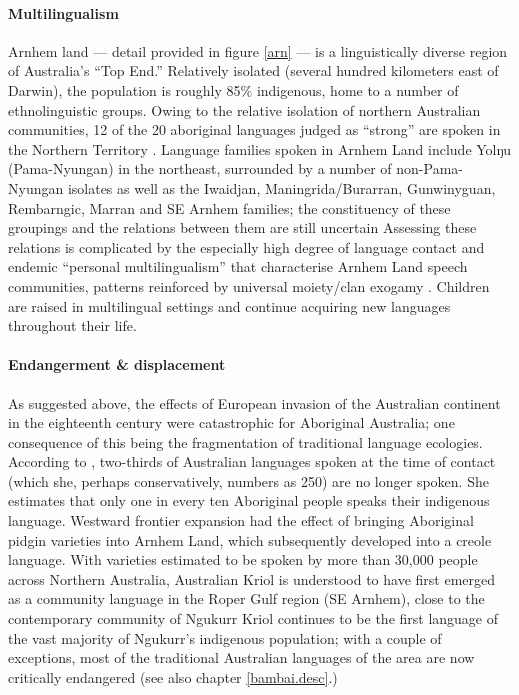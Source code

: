 \documentclass[12pt,dvipsnames]{report}
\begin{document}
\paragraph*{Multilingualism}

Arnhem land --- detail provided in figure \ref{arn} --- is a linguistically diverse region of Australia's ``Top End.'' Relatively isolated (several hundred kilometers east of Darwin), the population is roughly 85\% indigenous, home to a number of ethnolinguistic groups. Owing to the relative isolation of northern Australian communities, 12 of the 20 aboriginal languages judged as ``strong'' are spoken in the Northern Territory \citep[3]{Schmidt1990}. Language families spoken in Arnhem Land include Yolŋu (Pama-Nyungan) in the northeast, surrounded by a number of non-Pama-Nyungan isolates as well as the Iwaidjan, Maningrida/Burarran, Gunwinyguan, Rembarngic, Marran and SE Arnhem families; the constituency of these groupings and the relations between them are still uncertain \citetext{see \textit{e.g.}, \citealp{Green2003} for the proto-Arnhem proposal.} Assessing these relations is complicated by the especially high degree of language contact and endemic ``personal multilingualism'' that characterise Arnhem Land speech communities, patterns reinforced by universal moiety/clan exogamy \citetext{\citealp{McConvell2011,Evans2001}, see also \citealp[Ch. 1]{Williams1986,Wilkinson1991} for a discussion of clan exogamy in Yolŋu society}. Children are raised in multilingual settings and continue acquiring new languages throughout their life. 

\paragraph*{Endangerment \& displacement}

As suggested above, the effects of European invasion of the Australian continent in the eighteenth century were catastrophic for Aboriginal Australia; one consequence of this being the fragmentation of traditional language ecologies. According to \citet[1]{Schmidt1990}, two-thirds of Australian languages spoken at the time of contact (which she, perhaps conservatively, numbers as 250) are no longer spoken. She estimates that only one in every ten Aboriginal people speaks their indigenous language. Westward frontier expansion had the effect of bringing Aboriginal pidgin varieties into Arnhem Land, which subsequently developed into a creole language. With varieties estimated to be spoken by more than 30,000 people across Northern Australia, Australian Kriol is understood to have first emerged as a community language in the Roper Gulf region (SE Arnhem), close to the contemporary community of Ngukurr \citetext{\textit{e.g.}, \citealp{Harris1986a}, see also \citealp{Phillips2011} for an overview.} Kriol continues to be the first language of the vast majority of Ngukurr's indigenous population; with a couple of exceptions, most of the traditional Australian languages of the area are now critically endangered (see also chapter \ref{bambai.desc}.)
\end{document}
